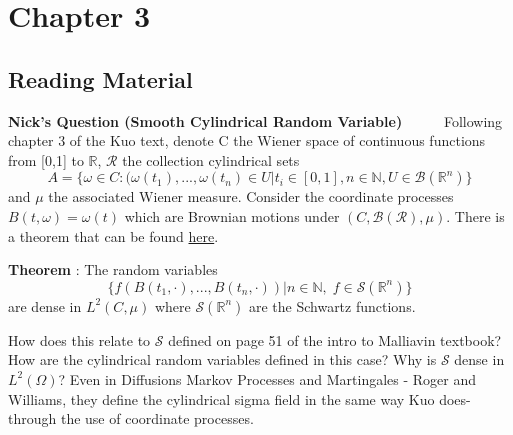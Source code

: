 \documentclass[a4paper,11pt]{article}
\numberwithin{equation}{section}
\theoremstyle{plain}
\theoremstyle{definition}
\newcommand{\R}{\mathbb{R}}
\newcounter{NQ}
\newenvironment{NickQuestion}[1][] %
{\refstepcounter{NQ}
	\begin{mdframed}[backgroundcolor=lightgray]\textbf{Nick's Question \theNQ \: #1~~}~~~\noindent}%
	{\end{mdframed}}
\numberwithin{NQ}{section}
\numberwithin{LQ}{section}
\numberwithin{ZQ}{section}
\begin{document}
\section{Chapter 3}
\subsection{Reading Material}
\begin{NickQuestion}[(Smooth Cylindrical Random Variable)]
	Following chapter 3 of the Kuo text, denote C the Wiener space of continuous functions from [0,1] to $\R$, $\mathcal R$ the collection cylindrical sets
	\[
	A = \{\omega \in C : (\omega(t_1),...,\omega(t_n) \in U \big| t_i \in [0,1], n \in \mathbb N, U \in \mathscr B (\R^n)  \}
	\]
	and $\mu$ the associated Wiener measure. Consider the coordinate processes $B(t,\omega)=\omega(t)$ which are Brownian motions under $(C,\mathcal B(\mathcal R), \mu)$. There is a theorem that can be found \href{https://math.stackexchange.com/questions/750049/density-of-cylindrical-random-variables-in-classical-wiener-space}{here}.

	\textbf{Theorem} : The random variables
	\[
	\{f(B(t_1,\cdot),...,B(t_n,\cdot)) \big| n\in \mathbb N,\; f \in \mathscr S (\R^n)  \}
	\]
	are dense in $L^2(C,\mu)$ where $\mathscr S (\R^n)$ are the Schwartz functions.

	How does this relate to $\mathcal S$ defined on page 51 of the intro to Malliavin textbook? How are the cylindrical random variables defined in this case? Why is $\mathcal S$ dense in $L^2(\Omega)$? Even in Diffusions Markov Processes and Martingales - Roger and Williams, they define the cylindrical sigma field in the same way Kuo does- through the use of coordinate processes.
\end{NickQuestion}
\end{document}

